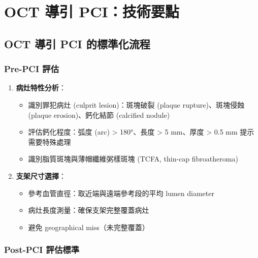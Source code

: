 \documentclass[12pt,a4paper]{article}
\begin{document}
\section{OCT 導引 PCI：技術要點}

\subsection{OCT 導引 PCI 的標準化流程}


\subsubsection{Pre-PCI 評估}

\begin{enumerate}
    \item \textbf{病灶特性分析}：
    \begin{itemize}
        \item 識別罪犯病灶 (culprit lesion)：斑塊破裂 (plaque rupture)、斑塊侵蝕 (plaque erosion)、鈣化結節 (calcified nodule)
        \item 評估鈣化程度：弧度 (arc) > 180°、長度 > 5 mm、厚度 > 0.5 mm 提示需要特殊處理
        \item 識別脂質斑塊與薄帽纖維粥樣斑塊 (TCFA, thin-cap fibroatheroma)
    \end{itemize}

    \item \textbf{支架尺寸選擇}：
    \begin{itemize}
        \item 參考血管直徑：取近端與遠端參考段的平均 lumen diameter
        \item 病灶長度測量：確保支架完整覆蓋病灶
        \item 避免 geographical miss（未完整覆蓋）
    \end{itemize}
\end{enumerate}

\subsubsection{Post-PCI 評估標準}
\end{document}
